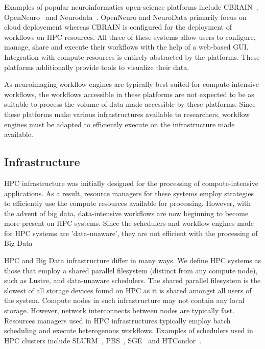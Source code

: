             Examples of popular neuroinformatics open-science platforms include
            CBRAIN~\cite{10.3389/fninf.2014.00054},
            OpenNeuro~\cite{gorgolewski2017openneuro} and
            Neurodata~\cite{burns2018community}. OpenNeuro and NeuroData
            primarily focus on cloud deployement whereas CBRAIN is configured
            for the deployment of workflows on HPC resources. All three of these
            systems allow users to configure, manage, share and execute their
            workflows with the help of a web-based GUI. Integration with compute
            resources is entirely abstracted by the platforms. These platforms
            additionally provide tools to visualize their data.

            As neuroimaging workflow engines are typically best suited for
            compute-intensive workflows, the workflows accessible in these
            platforms are not expected to be as suitable to process the volume
            of data made accessible by these platforms. Since these platforms
            make various infrastructures available to researchers, workflow
            engines must be adapted to efficiently execute on the infrastructure
            made available.
            
        \subsection{Infrastructure}\label{infrastructure} HPC infrastructure was
            initially designed for the processing of compute-intensive
            applications. As a result, resource managers for these systems
            employ strategies to efficiently use the compute resources available
            for processing. However, with the advent of big data, data-intensive
            workflows are now beginning to become more present on HPC systems.
            Since the schedulers and workflow engines made for HPC systems are
            'data-unaware', they are not efficient with the processing of Big
            Data

            HPC and Big Data infrastructure differ in many ways. We define HPC
            systems as those that employ a shared parallel filesystem (distinct
            from any compute node), such as Lustre, and data-unaware schedulers.
            The shared parallel filesystem is the slowest of all storage devices
            found on HPC as it is shared amongst all users of the system.
            Compute nodes in such infrastructure may not contain any local
            storage. However, network interconnects between nodes are typically
            fast. Resources managers used in HPC infrastructures typically
            employ batch scheduling and execute heterogenous workflows. Examples
            of schedulers used in HPC clusters include
            SLURM~\cite{yoo2003slurm}, PBS~\cite{10.1007/3-540-60153-8_34},
            SGE~\cite{SGE} and HTCondor~\cite{htcondor}.


